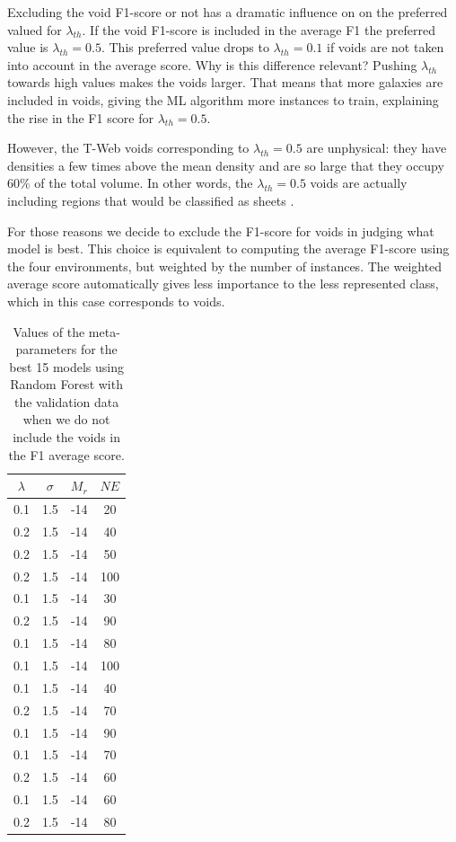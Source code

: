 \documentclass[usenatbib]{mnras}
\begin{document}
Excluding the void F1-score or not has a dramatic influence on
on the preferred valued for $\lambda_{th}$. 
If the void F1-score is included in the average F1 the preferred value is
$\lambda_{th}=0.5$. 
This preferred value drops to $\lambda_{th}=0.1$  if voids are not taken into account in the average score.
Why is this difference relevant?
Pushing $\lambda_{th}$ towards high values makes the voids larger.
That means that more galaxies are included in voids, giving the ML algorithm more instances to train, explaining the rise in the F1 score for $\lambda_{th}=0.5$.

However, the T-Web voids corresponding to $\lambda_{th}=0.5$ are unphysical: they have densities a few times above the mean
density and are so large that they occupy $60\%$ of the total volume.
In other words, the $\lambda_{th}=0.5$ voids are actually including regions that would be classified as sheets
\citep{Bustamante2015, Forero-Romero2009}. 

For those reasons we decide to exclude the F1-score for voids in
judging what model is best.
This choice is equivalent to computing the average F1-score using the
four environments, but weighted by the number of instances. 
The weighted average score automatically gives less importance to the
less represented class, which in this case corresponds to voids.

\begin{table}
\centering
\begin{tabular}{cccc}
\hline
   $\lambda$ &   $\sigma$ &   $M_r$ &   $NE$ \\
\hline
         0.1 &        1.5 &     -14 &     20 \\
         0.2 &        1.5 &     -14 &     40 \\
         0.2 &        1.5 &     -14 &     50 \\
         0.2 &        1.5 &     -14 &    100 \\
         0.1 &        1.5 &     -14 &     30 \\
         0.2 &        1.5 &     -14 &     90 \\
         0.1 &        1.5 &     -14 &     80 \\
         0.1 &        1.5 &     -14 &    100 \\
         0.1 &        1.5 &     -14 &     40 \\
         0.2 &        1.5 &     -14 &     70 \\
         0.1 &        1.5 &     -14 &     90 \\
         0.1 &        1.5 &     -14 &     70 \\
         0.2 &        1.5 &     -14 &     60 \\
         0.1 &        1.5 &     -14 &     60 \\
         0.2 &        1.5 &     -14 &     80 \\
\hline
\end{tabular}
\caption{Values of the meta-parameters for the best 15 models using Random Forest with the validation data when we do not include the voids in the F1 average score.}
\label{tab:parameters}
\end{table}
\end{document}

